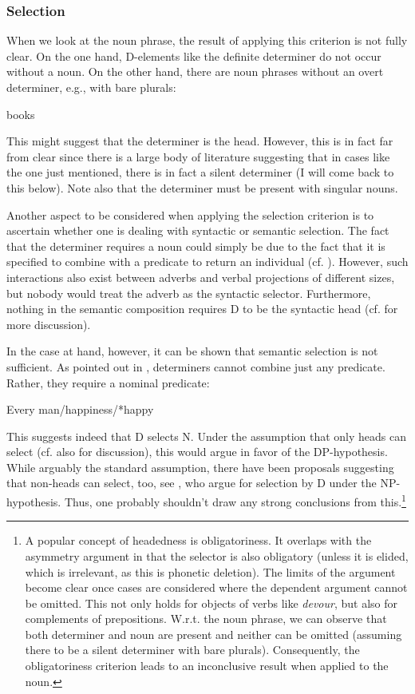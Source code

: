 \documentclass[output=paper,colorlinks,citecolor=black,
]{langscibook}
\begin{document}
\subsubsection{Selection}

When we look at the noun phrase, the result of applying this criterion is not fully clear. On the one hand, D-elements like the definite determiner do not occur without a noun. On the other hand, there are noun phrases without an overt determiner, e.g., with bare plurals:

\ea books
\z

This might suggest that the determiner is the head. However, this is in fact far from clear since there is a large body of literature suggesting that in cases like the one just mentioned, there is in fact a silent determiner (I will come back to this below). Note also that the determiner must be present with singular nouns. 

Another aspect to be considered when applying the selection criterion is to ascertain whether one is dealing with syntactic or semantic selection. The fact that the determiner requires a noun could simply be due to the fact that it is specified to combine with a predicate to return an individual (cf. \citealt{Longobardi:1994:Reference-properNames}). However, such interactions also exist between adverbs and verbal projections of different sizes, but nobody would treat the adverb as the syntactic selector. Furthermore, nothing in the semantic composition requires D to be the syntactic head (cf. \citealt[31]{Bruening:2009:DP} for more discussion).

In the case at hand, however, it can be shown that semantic selection is not sufficient. As pointed out in \citet{Larson:to-appear:DP-hypothesisDP-CP}, determiners cannot combine just any predicate. Rather, they require a nominal predicate:

\ea Every man/happiness/*happy
\z 

This suggests indeed that D selects N. Under the assumption that only heads can select (cf. also \citealt{Zwicky:1985:heads} for discussion), this would argue in favor of the DP-hypothesis. While arguably the standard assumption, there have been proposals suggesting that non-heads can select, too, see \citet{Bruening-et-al:2018:Selection-Idioms-NP}, who argue for selection by D under the NP-hypothesis. Thus, one probably shouldn't draw any strong conclusions from this.\footnote{A popular concept of headedness is obligatoriness. It overlaps with the asymmetry argument in that the selector is also obligatory (unless it is elided, which is irrelevant, as this is phonetic deletion). The limits of the argument become clear once cases are considered where the dependent argument cannot be omitted. This not only holds for objects of verbs like \textit{devour}, but also for complements of prepositions. W.r.t. the noun phrase, we can observe that both determiner and noun are present and neither can be omitted (assuming there to be a silent determiner with bare plurals). Consequently, the obligatoriness criterion leads to an inconclusive result when applied to the noun.}
\end{document}

